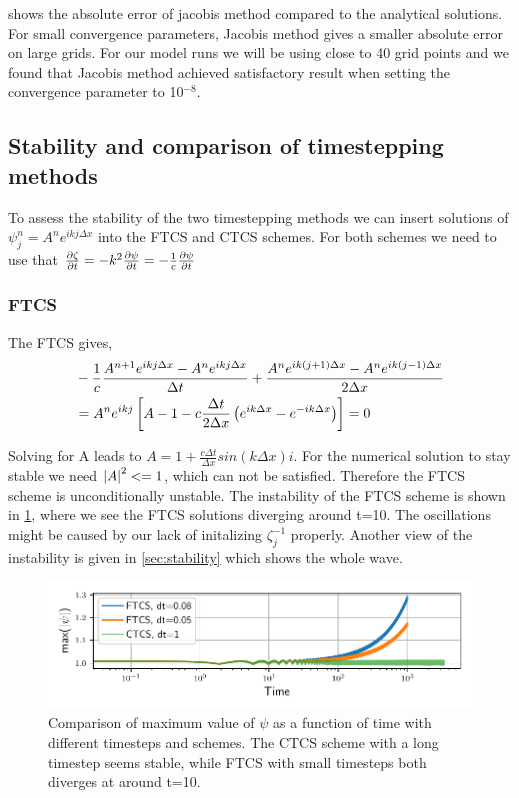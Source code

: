 shows the absolute error of jacobis method compared to the analytical solutions.
For small convergence parameters, Jacobis method gives a smaller
absolute error on large grids.
For our model runs we will be using close to 40 grid points and we found that
Jacobis method achieved satisfactory result when setting the convergence
parameter to 10$^{-8}$.

\subsection{Stability and comparison of timestepping methods}

To assess the stability of the two timestepping methods we can insert solutions
of $\psi_{j}^{n} = A^n e^{ikj \Delta x}$ into the FTCS and CTCS schemes.
For both schemes we need to use that
$\pdv{\zeta}{t} = -k^2 \pdv{\psi}{t} = - \frac{1}{c} \pdv{\psi}{t}$

\subsubsection{FTCS}
The FTCS gives,
\begin{align}
  &-\frac{1}{c} \frac{A^{n+1} e^{ikj\Delta x} - A^n e^{ikj\Delta x}}{\Delta t} + \frac{A^n e^{ik(j+1)\Delta x} - A^n e^{ik(j-1)\Delta x}}{2\Delta x} \\
  &= A^n e^{ikj} \left[A - 1 - c\frac{\Delta t}{2 \Delta x} \left(e^{ik\Delta x} - e^{-ik\Delta x}\right)\right] = 0
\end{align}

Solving for A leads to $ A = 1 + \frac{c \Delta t}{\Delta x} sin(k\Delta x) i$.
For the numerical solution to stay stable we need $\abs{A}^2 <= 1$, which can
not be satisfied. Therefore the FTCS scheme is unconditionally unstable. The
instability of the FTCS scheme is shown in \cref{fig:compare_small}, where we
see the FTCS solutions diverging around t=10. The oscillations might be caused
by our lack of initalizing $\zeta_{j}^{-1}$ properly. Another view of the
instability is given in \cref{sec:stability} which shows the whole wave.

\begin{figure}[h]
  \centering
  \includegraphics[width=\textwidth]{../figures/stability_compare.pdf}
  \caption{Comparison of maximum value of $\psi$ as a function of time with
  different timesteps and schemes.
  The CTCS scheme with a long timestep seems stable, while FTCS with small timesteps
  both diverges at around t=10.}
  \label{fig:compare_small}
\end{figure}


